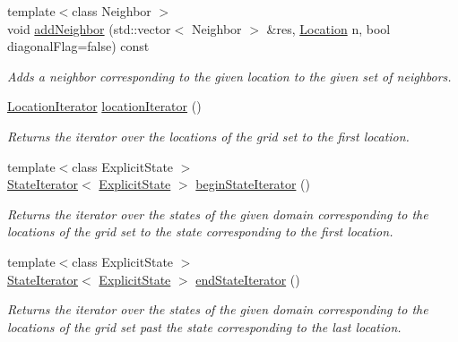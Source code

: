\begin{DoxyCompactItemize}
\item 
{\footnotesize template$<$class Neighbor $>$ }\\void \hyperlink{structslb_1_1ext_1_1explicit__space_1_1Grid_a804425c4377ce2933be9f3ea655dd940}{add\+Neighbor} (std\+::vector$<$ Neighbor $>$ \&res, \hyperlink{structslb_1_1ext_1_1explicit__space_1_1Grid_a2b2125f1774b299ea7f0f9f21d967fde}{Location} n, bool diagonal\+Flag=false) const 
\begin{DoxyCompactList}\small\item\em Adds a neighbor corresponding to the given location to the given set of neighbors. \end{DoxyCompactList}\item 
\hyperlink{structslb_1_1ext_1_1explicit__space_1_1Grid_a75c71647e997ddb8f8f442d4e173d962}{Location\+Iterator} \hyperlink{structslb_1_1ext_1_1explicit__space_1_1Grid_a0136e082c52c7d3c7334b64fd69f4985}{location\+Iterator} ()
\begin{DoxyCompactList}\small\item\em Returns the iterator over the locations of the grid set to the first location. \end{DoxyCompactList}\item 
{\footnotesize template$<$class Explicit\+State $>$ }\\\hyperlink{structslb_1_1ext_1_1explicit__space_1_1Grid_1_1StateIterator}{State\+Iterator}$<$ \hyperlink{structslb_1_1core_1_1sb_1_1ExplicitState}{Explicit\+State} $>$ \hyperlink{structslb_1_1ext_1_1explicit__space_1_1Grid_ac672b9b4974011f4c10243a9c42e5e5e}{begin\+State\+Iterator} ()
\begin{DoxyCompactList}\small\item\em Returns the iterator over the states of the given domain corresponding to the locations of the grid set to the state corresponding to the first location. \end{DoxyCompactList}\item 
{\footnotesize template$<$class Explicit\+State $>$ }\\\hyperlink{structslb_1_1ext_1_1explicit__space_1_1Grid_1_1StateIterator}{State\+Iterator}$<$ \hyperlink{structslb_1_1core_1_1sb_1_1ExplicitState}{Explicit\+State} $>$ \hyperlink{structslb_1_1ext_1_1explicit__space_1_1Grid_a6652bd758225247b7bbc741461d4bf67}{end\+State\+Iterator} ()
\begin{DoxyCompactList}\small\item\em Returns the iterator over the states of the given domain corresponding to the locations of the grid set past the state corresponding to the last location. \end{DoxyCompactList}\end{DoxyCompactItemize}
